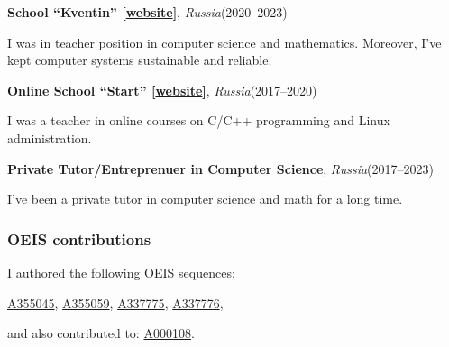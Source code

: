 \documentclass[11pt]{article}
\begin{document}
\vspace{2mm}
\noindent\textbf{School ``Kventin'' [\href{https://kventinptz.ru}{website}]}, \textit{Russia}\hfill(2020--2023)

I was in teacher position in computer science and mathematics. Moreover, I've kept computer systems sustainable and reliable.

\vspace{2mm}
\noindent\textbf{Online School ``Start'' [\href{http://schoolprogstart.tilda.ws}{website}]}, \textit{Russia}\hfill(2017--2020)

I was a teacher in online courses on C/C++ programming and Linux administration. 

\vspace{2mm}
\noindent\textbf{Private Tutor/Entreprenuer in Computer Science}, \textit{Russia}\hfill(2017--2023)

I've been a private tutor in computer science and math for a long time.


\nocite{*}
\printbibliography[heading={subbibliography},title={Journal Articles},type=article]

\printbibliography[heading={subbibliography},title={Conference Proceedings},type=inproceedings]



\subsubsection*{OEIS contributions}
I authored the following OEIS sequences:

\noindent\href{https://oeis.org/A355045}{A355045}, \href{https://oeis.org/A355059}{A355059}, \href{https://oeis.org/A337775}{A337775}, \href{https://oeis.org/A337776}{A337776},

\noindent and also contributed to: \href{https://oeis.org/A000108}{A000108}.


%
%
%
\end{document}

